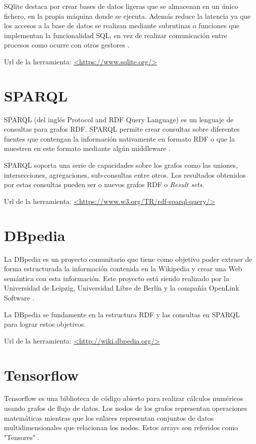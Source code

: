 SQlite destaca por crear bases de datos ligeras que se almacenan en un único fichero, en la propia máquina donde se ejecuta. Además reduce la latencia ya que los accesos a la base de datos se realizan mediante subrutinas o funciones que implementan la funcionalidad SQL, en vez de realizar comunicación entre procesos como ocurre con otros gestores \cite{wiki:SQlite}.

Url de la herramienta: \url{<https://www.sqlite.org/>}

\section{SPARQL}

SPARQL (del inglés Protocol and RDF Query Language) es un lenguaje de consultas para grafos RDF. SPARQL permite crear consultas sobre diferentes fuentes que contengan la información nativamente en formato RDF o que la muestren en este formato mediante algún middleware \cite{SPARQL}.

SPARQL soporta una serie de capacidades sobre los grafos como las uniones, intersecciones, agregaciones, sub-consultas entre otros. Los resultados obtenidos por estas consultas pueden ser o nuevos grafos RDF o \textit{Result sets}.

Url de la herramienta: \url{<https://www.w3.org/TR/rdf-sparql-query/>}


\section{DBpedia}

La DBpedia es un proyecto comunitario que tiene como objetivo poder extraer de forma estructurada la información contenida en la Wikipedia y crear una Web semántica con esta información. Este proyecto está siendo realizado por la Universidad de Leipzig, Universidad Libre de Berlín y la compañía OpenLink Software \cite{wiki:DBpedia}.

La DBpedia se fundamente en la estructura RDF y las consultas en SPARQL para lograr estos objetivos.

Url de la herramienta: \url{<http://wiki.dbpedia.org/>}

\section{Tensorflow}

Tensorflow es una biblioteca de código abierto para realizar cálculos numéricos usando grafos de flujo de datos. Los nodos de los grafos representan operaciones matemáticas mientras que los enlaces representan conjuntos de datos multidimensionales que relacionan los nodos. Estos arrays son referidos como "Tensores" \cite{wiki:Tensorflow}.

